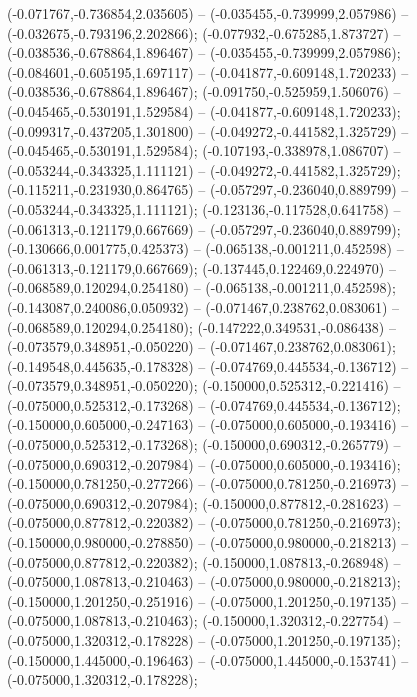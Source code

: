  (-0.071767,-0.736854,2.035605) -- (-0.035455,-0.739999,2.057986) -- (-0.032675,-0.793196,2.202866);
 (-0.077932,-0.675285,1.873727) -- (-0.038536,-0.678864,1.896467) -- (-0.035455,-0.739999,2.057986);
 (-0.084601,-0.605195,1.697117) -- (-0.041877,-0.609148,1.720233) -- (-0.038536,-0.678864,1.896467);
 (-0.091750,-0.525959,1.506076) -- (-0.045465,-0.530191,1.529584) -- (-0.041877,-0.609148,1.720233);
 (-0.099317,-0.437205,1.301800) -- (-0.049272,-0.441582,1.325729) -- (-0.045465,-0.530191,1.529584);
 (-0.107193,-0.338978,1.086707) -- (-0.053244,-0.343325,1.111121) -- (-0.049272,-0.441582,1.325729);
 (-0.115211,-0.231930,0.864765) -- (-0.057297,-0.236040,0.889799) -- (-0.053244,-0.343325,1.111121);
 (-0.123136,-0.117528,0.641758) -- (-0.061313,-0.121179,0.667669) -- (-0.057297,-0.236040,0.889799);
 (-0.130666,0.001775,0.425373) -- (-0.065138,-0.001211,0.452598) -- (-0.061313,-0.121179,0.667669);
 (-0.137445,0.122469,0.224970) -- (-0.068589,0.120294,0.254180) -- (-0.065138,-0.001211,0.452598);
 (-0.143087,0.240086,0.050932) -- (-0.071467,0.238762,0.083061) -- (-0.068589,0.120294,0.254180);
 (-0.147222,0.349531,-0.086438) -- (-0.073579,0.348951,-0.050220) -- (-0.071467,0.238762,0.083061);
 (-0.149548,0.445635,-0.178328) -- (-0.074769,0.445534,-0.136712) -- (-0.073579,0.348951,-0.050220);
 (-0.150000,0.525312,-0.221416) -- (-0.075000,0.525312,-0.173268) -- (-0.074769,0.445534,-0.136712);
 (-0.150000,0.605000,-0.247163) -- (-0.075000,0.605000,-0.193416) -- (-0.075000,0.525312,-0.173268);
 (-0.150000,0.690312,-0.265779) -- (-0.075000,0.690312,-0.207984) -- (-0.075000,0.605000,-0.193416);
 (-0.150000,0.781250,-0.277266) -- (-0.075000,0.781250,-0.216973) -- (-0.075000,0.690312,-0.207984);
 (-0.150000,0.877812,-0.281623) -- (-0.075000,0.877812,-0.220382) -- (-0.075000,0.781250,-0.216973);
 (-0.150000,0.980000,-0.278850) -- (-0.075000,0.980000,-0.218213) -- (-0.075000,0.877812,-0.220382);
 (-0.150000,1.087813,-0.268948) -- (-0.075000,1.087813,-0.210463) -- (-0.075000,0.980000,-0.218213);
 (-0.150000,1.201250,-0.251916) -- (-0.075000,1.201250,-0.197135) -- (-0.075000,1.087813,-0.210463);
 (-0.150000,1.320312,-0.227754) -- (-0.075000,1.320312,-0.178228) -- (-0.075000,1.201250,-0.197135);
 (-0.150000,1.445000,-0.196463) -- (-0.075000,1.445000,-0.153741) -- (-0.075000,1.320312,-0.178228);
